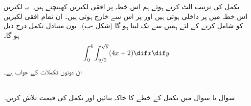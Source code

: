 تکمل کی ترتیب الٹ کرتے ہوئے ہم اس خطہ  پر افقی لکیریں کھینچتے ہیں۔ یہ لکیریں اس خطہ میں  پر داخلی ہوتی ہیں اور  پر اس سے خارج ہوتی ہیں۔ ان تمام افقی لکیریں کو شامل کرنے کے لئے ہمیں  سے  تک لینا ہو گا (شکل -ب)۔ یوں  متبادل تکمل درج ذیل ہو گا۔
\begin{align*}
\int_0^4\int_{y/2}^{\sqrt{y}}(4x+2)\dif x\dif y
\end{align*}
ان دونوں تکملات کے جواب  ہے۔

\\
سوال  تا سوال  میں تکمل کے  خطے کا خاکہ بنائیں اور تکمل کی قیمت تلاش کریں۔ 

